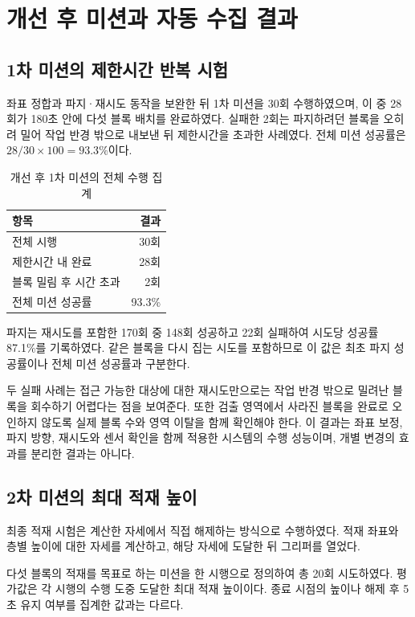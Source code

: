 \section{개선 후 미션과 자동 수집 결과}
\subsection{1차 미션의 제한시간 반복 시험}
\label{sec:pick-rate}
좌표 정합과 파지·재시도 동작을 보완한 뒤 1차 미션을 30회 수행하였으며, 이 중 28회가 180초 안에 다섯 블록 배치를 완료하였다. 실패한 2회는 파지하려던 블록을 오히려 밀어 작업 반경 밖으로 내보낸 뒤 제한시간을 초과한 사례였다. 전체 미션 성공률은 $28/30\times100=93.3\%$이다.

\begin{table}[htbp]
\centering
\caption{개선 후 1차 미션의 전체 수행 집계}
\begin{tabular}{@{}lr@{}}
\toprule 항목 & 결과 \\
\midrule 전체 시행 & 30회 \\
제한시간 내 완료 & 28회 \\
블록 밀림 후 시간 초과 & 2회 \\
전체 미션 성공률 & 93.3\% \\
\bottomrule
\end{tabular}
\end{table}

파지는 재시도를 포함한 170회 중 148회 성공하고 22회 실패하여 시도당 성공률 87.1\%를 기록하였다. 같은 블록을 다시 집는 시도를 포함하므로 이 값은 최초 파지 성공률이나 전체 미션 성공률과 구분한다.

두 실패 사례는 접근 가능한 대상에 대한 재시도만으로는 작업 반경 밖으로 밀려난 블록을 회수하기 어렵다는 점을 보여준다. 또한 검출 영역에서 사라진 블록을 완료로 오인하지 않도록 실제 블록 수와 영역 이탈을 함께 확인해야 한다. 이 결과는 좌표 보정, 파지 방향, 재시도와 센서 확인을 함께 적용한 시스템의 수행 성능이며, 개별 변경의 효과를 분리한 결과는 아니다.

\subsection{2차 미션의 최대 적재 높이}
\label{sec:stack-results}
최종 적재 시험은 계산한 자세에서 직접 해제하는 방식으로 수행하였다. 적재 좌표와 층별 높이에 대한 자세를 계산하고, 해당 자세에 도달한 뒤 그리퍼를 열었다.

다섯 블록의 적재를 목표로 하는 미션을 한 시행으로 정의하여 총 20회 시도하였다. 평가값은 각 시행의 수행 도중 도달한 최대 적재 높이이다. 종료 시점의 높이나 해제 후 5초 유지 여부를 집계한 값과는 다르다.

